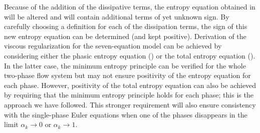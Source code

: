 Because of the addition of the dissipative terms, the entropy equation obtained in 
will be altered and will contain additional terms of yet unknown sign. By carefully choosing 
a definition for each of the dissipation terms, the sign of this new entropy equation can be determined (and kept positive). Derivation of the viscous 
regularization for the seven-equation model can be achieved by considering either the phasic entropy equation () or the 
total entropy equation (). In the latter case, the minimum entropy principle can be verified for the whole two-phase flow system 
but may not ensure positivity of the entropy equation for each phase. However, positivity of the total entropy equation can also be achieved by requiring 
that the minimum entropy principle holds for each phase; this is the approach we have followed. This stronger requirement will also ensure consistency 
with the single-phase Euler equations when one of the phases disappears in the limit $\alpha_k \to 0$ or $\alpha_k \to 1$. 
%
